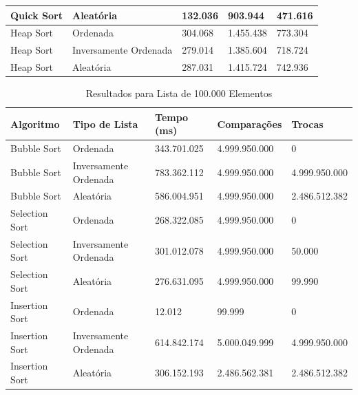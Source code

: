 \documentclass[tcc2]{uftex}
\begin{document}
\begin{table}[h]
\begin{tabular}{|l|l|l|l|l|}
Quick Sort           & Aleatória                    & 132.036             & 903.944              & 471.616        \\ \hline
Heap Sort            & Ordenada                     & 304.068             & 1.455.438            & 773.304        \\ \hline
Heap Sort            & Inversamente Ordenada        & 279.014             & 1.385.604            & 718.724        \\ \hline
Heap Sort            & Aleatória                    & 287.031             & 1.415.724            & 742.936        \\ \hline
\end{tabular}
\end{table}




\begin{table}[h]
\centering
\caption{Resultados para Lista de 100.000 Elementos}
\begin{tabular}{|l|l|l|l|l|}
\hline
\textbf{Algoritmo}   & \textbf{Tipo de Lista}       & \textbf{Tempo (ms)} & \textbf{Comparações} & \textbf{Trocas} \\ \hline
Bubble Sort          & Ordenada                     & 343.701.025         & 4.999.950.000        & 0              \\ \hline
Bubble Sort          & Inversamente Ordenada        & 783.362.112         & 4.999.950.000        & 4.999.950.000  \\ \hline
Bubble Sort          & Aleatória                    & 586.004.951         & 4.999.950.000        & 2.486.512.382  \\ \hline
Selection Sort       & Ordenada                     & 268.322.085         & 4.999.950.000        & 0              \\ \hline
Selection Sort       & Inversamente Ordenada        & 301.012.078         & 4.999.950.000        & 50.000         \\ \hline
Selection Sort       & Aleatória                    & 276.631.095         & 4.999.950.000        & 99.990         \\ \hline
Insertion Sort       & Ordenada                     & 12.012              & 99.999               & 0              \\ \hline
Insertion Sort       & Inversamente Ordenada        & 614.842.174         & 5.000.049.999        & 4.999.950.000  \\ \hline
Insertion Sort       & Aleatória                    & 306.152.193         & 2.486.562.381        & 2.486.512.382  \\ \hline

\end{tabular}
\end{table}
\end{document}
